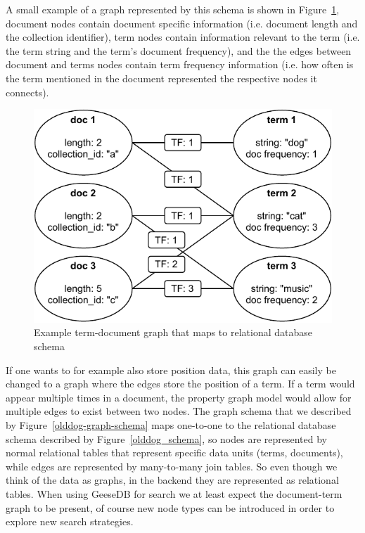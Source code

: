 A small example of a graph represented by this schema is shown in Figure~\ref{example-olddog-graph}, document nodes contain document specific information (i.e. document length and the collection identifier), term nodes contain information relevant to the term (i.e. the term string and the term's document frequency), and the the edges between document and terms nodes contain term frequency information (i.e. how often is the term mentioned in the document represented the respective nodes it connects).
\begin{figure}
	\centering
	\includegraphics[width=\linewidth]{./imgs/example_olddog_graph.pdf}
	\caption{Example term-document graph that maps to relational database schema}
	\label{example-olddog-graph}
\end{figure}
If one wants to for example also store position data, this graph can easily be changed to a graph where the edges store the position of a term. If a term would appear multiple times in a document, the property graph model would allow for multiple edges to exist between two nodes. The graph schema that we described by Figure~\ref{olddog-graph-schema} maps one-to-one to the relational database schema described by Figure~\ref{olddog_schema}, so nodes are represented by normal relational tables that represent specific data units (terms, documents), while edges are represented by many-to-many join tables. So even though we think of the data as graphs, in the backend they are represented as relational tables. When using GeeseDB for search we at least expect the document-term graph to be present, of course new node types can be introduced in order to explore new search strategies. 

